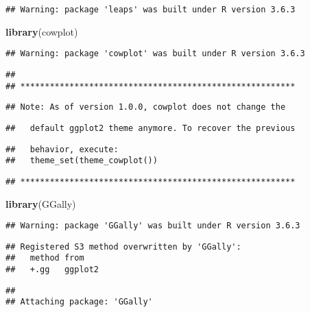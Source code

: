 \documentclass[
]{article}
\newenvironment{Shaded}{\begin{snugshade}}{\end{snugshade}}
\newcommand{\KeywordTok}[1]{\textcolor[rgb]{0.13,0.29,0.53}{\textbf{#1}}}
\newcommand{\NormalTok}[1]{#1}
\begin{document}
\begin{verbatim}
## Warning: package 'leaps' was built under R version 3.6.3
\end{verbatim}

\begin{Shaded}
\begin{Highlighting}[]
\KeywordTok{library}\NormalTok{(cowplot)}
\end{Highlighting}
\end{Shaded}

\begin{verbatim}
## Warning: package 'cowplot' was built under R version 3.6.3
\end{verbatim}

\begin{verbatim}
## 
## ********************************************************
\end{verbatim}

\begin{verbatim}
## Note: As of version 1.0.0, cowplot does not change the
\end{verbatim}

\begin{verbatim}
##   default ggplot2 theme anymore. To recover the previous
\end{verbatim}

\begin{verbatim}
##   behavior, execute:
##   theme_set(theme_cowplot())
\end{verbatim}

\begin{verbatim}
## ********************************************************
\end{verbatim}

\begin{Shaded}
\begin{Highlighting}[]
\KeywordTok{library}\NormalTok{(GGally)}
\end{Highlighting}
\end{Shaded}

\begin{verbatim}
## Warning: package 'GGally' was built under R version 3.6.3
\end{verbatim}

\begin{verbatim}
## Registered S3 method overwritten by 'GGally':
##   method from   
##   +.gg   ggplot2
\end{verbatim}

\begin{verbatim}
## 
## Attaching package: 'GGally'
\end{verbatim}
\end{document}
